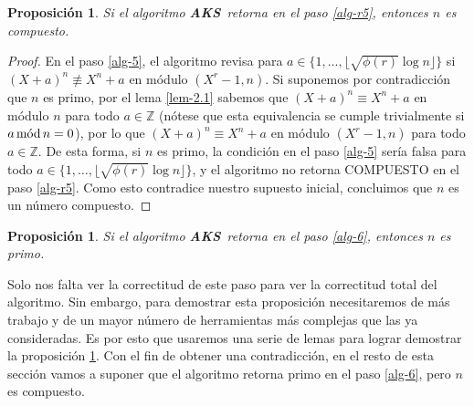 \documentclass[10pt]{article}
\newcommand{\0}{\mathbf{0}}
\newcommand{\1}{\mathbf{1}}
\newcommand{\mods}{\,\text{\rm mód}\,}
\newcommand{\+}{\oplus}
\newcommand{\comentario}[1]{}
\newcommand{\comentarioin}[1]{}
\newtheorem{proposition}[theorem]{Proposición}
\theoremstyle{remark}
\theoremstyle{remark}
\newcommand{\AKS}{{\rm \textbf{AKS}}}
\begin{document}
	\begin{proposition}
		Si el algoritmo \AKS\ retorna en el paso \ref{alg-r5}, entonces $n$ es compuesto.
	\end{proposition}
	\begin{proof}
	En el paso \ref{alg-5}, el algoritmo revisa para $a\in \{1, \ldots, \lfloor \sqrt{\phi(r)} \log n\rfloor\}$ si $(X+a)^n \not\equiv X^n+a$ en módulo $(X^r-1,n)$. Si suponemos por contradicción que $n$ es primo, por el lema \ref{lem-2.1} sabemos que $(X+a)^n \equiv X^n+a$ en módulo $n$ para todo $a \in \mathbb{Z}$ (nótese que esta equivalencia se cumple trivialmente si $a\mods n = 0$), por lo que $(X+a)^n \equiv X^n+a$ en módulo $(X^r-1,n)$ para todo $a \in \mathbb{Z}$. De esta forma, si $n$ es primo, la condición en el paso \ref{alg-5} sería falsa para todo  $a\in \{1, \ldots, \lfloor \sqrt{\phi(r)} \log n\rfloor\}$, y el algoritmo no retorna COMPUESTO en el paso \ref{alg-r5}. Como esto contradice nuestro supuesto inicial, concluimos que $n$ es un número compuesto.
	\end{proof}
	
	\begin{proposition}\label{prop:paso_final}
		Si el algoritmo \AKS\ retorna en el paso \ref{alg-6}, entonces $n$ es primo.
	\end{proposition}
	Solo nos falta ver la correctitud de este paso para ver la correctitud total del algoritmo.
	Sin embargo, para demostrar esta proposición necesitaremos de más trabajo y de un mayor número de herramientas más complejas que las ya consideradas.
	Es por esto que usaremos una serie de lemas
        para lograr demostrar la proposición \ref{prop:paso_final}.
	Con el fin de obtener una contradicción, en el resto de esta sección vamos a suponer 	
	que el algoritmo retorna primo en el paso \ref{alg-6}, pero $n$ es compuesto.	
	
\end{document}
